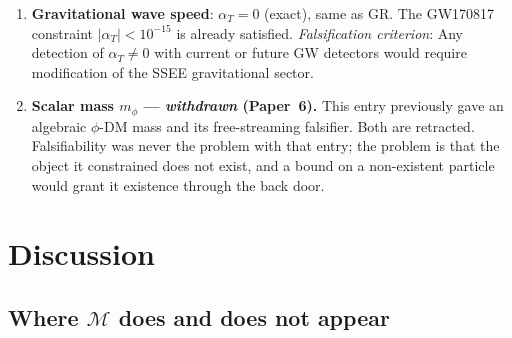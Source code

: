 \documentclass[12pt,a4paper]{article}
\newcommand{\MIRA}{\mathcal{M}}
\begin{document}
\begin{enumerate}
  \item \textbf{Gravitational wave speed}: $\alpha_T = 0$ (exact), same as GR.
        The GW170817 constraint $|\alpha_T| < 10^{-15}$ \citep{gw170817_2017}
        is already satisfied.
        \textit{Falsification criterion}: Any detection of $\alpha_T \neq 0$
        with current or future GW detectors would require modification of
        the SSEE gravitational sector.

  \item \textbf{Scalar mass $m_\phi$ --- \emph{withdrawn} (Paper~6).} This
        entry previously gave an algebraic $\phi$-DM mass and its
        free-streaming falsifier. Both are retracted. Falsifiability was never
        the problem with that entry; the problem is that the object it
        constrained does not exist, and a bound on a non-existent particle
        would grant it existence through the back door.

\end{enumerate}

\section{Discussion}
\label{sec:discussion}

\subsection{Where $\MIRA$ does and does not appear}
\end{document}
